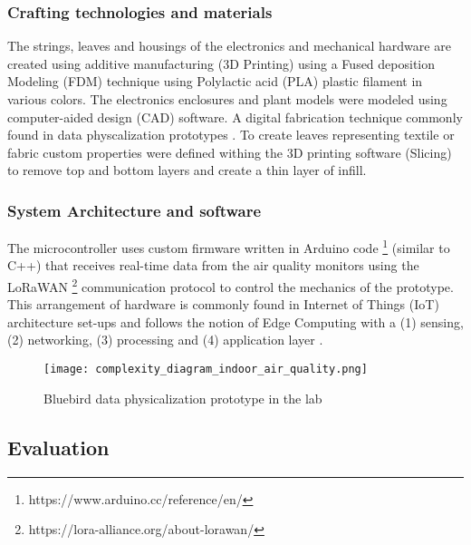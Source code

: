 \subsubsection{Crafting technologies and materials}
The strings, leaves and housings of the electronics and mechanical hardware are created using additive manufacturing (3D Printing) using a Fused deposition Modeling (FDM) technique using Polylactic acid (PLA) plastic filament in various colors. The electronics enclosures and plant models were modeled using computer-aided design (CAD) software. A digital fabrication technique commonly found in data physcalization prototypes \cite{anhalt_university_germany_design_2022}. To create leaves representing textile or fabric custom properties were defined withing the 3D printing software (Slicing) to remove top and bottom layers and create a thin layer of infill.

\subsubsection{System Architecture and software}

The microcontroller uses custom firmware written in Arduino code \footnote{https://www.arduino.cc/reference/en/} (similar to C++) that receives real-time data from the air quality monitors using the LoRaWAN \footnote{https://lora-alliance.org/about-lorawan/} communication protocol to control the mechanics of the prototype. This arrangement of hardware is commonly found in Internet of Things (IoT) architecture set-ups and follows the notion of Edge Computing with a (1) sensing, (2) networking, (3) processing and (4) application layer \cite{li_edge-oriented_2019, idrees_edge_2018}.

\begin{figure}[!h]
    \centering
    \texttt{[image: complexity\_diagram\_indoor\_air\_quality.png]}
    \caption{Bluebird data physicalization prototype in the lab}
    \label{fig:complexity}
\end{figure}

\subsection{Evaluation}

